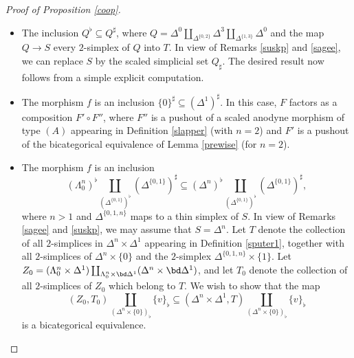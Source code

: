 \begin{proof}[Proof of Proposition \ref{coop}]
\begin{itemize}
\item[$(A_1)$] The inclusion $Q^{\flat} \subseteq Q^{\sharp}$, where
$Q = \Delta^0 \coprod_{ \Delta^{ \{0,2\} }} \Delta^3 \coprod_{ \Delta^{ \{1,3\} }} \Delta^0$
and the map $Q \rightarrow S$ every $2$-simplex
of $Q$ into $T$. In view of Remarks \ref{suskp} and \ref{sagee}, we can replace
$S$ by the scaled simplicial set $Q_{\sharp}$. The desired result now follows from a simple
explicit computation.


\item[$(B_0)$] The morphism $f$ is an inclusion $\{0\}^{\sharp} \subseteq ( \Delta^1)^{\sharp}$.
In this case, $F$ factors as a composition $F' \circ F''$, where $F''$ is a pushout of
a scaled anodyne morphism of type $(A)$ appearing in Definition \ref{slapper} (with $n=2$) and
$F'$ is a pushout of the bicategorical equivalence of Lemma \ref{prewise} (for $n=2$).

\item[$(C_0)$] The morphism $f$ is an inclusion
$$ (\Lambda^n_0)^{\flat} \coprod_{ (\Delta^{ \{0,1\} })^{\flat} } ( \Delta^{ \{0,1\} })^{\sharp}
\subseteq ( \Delta^n )^{\flat} \coprod_{ ( \Delta^{ \{0,1\} })^{\flat} } ( \Delta^{ \{0,1\} })^{\sharp},$$
where $n > 1$ and $\Delta^{ \{0,1,n\} }$ maps to a thin simplex of $S$. In view of
Remarks \ref{sagee} and \ref{suskp}, we may assume that $S = \Delta^n$.
Let $T$ denote the collection of all $2$-simplices in $\Delta^n \times \Delta^1$ appearing
in Definition \ref{sputer1}, together with
all $2$-simplices of $\Delta^n \times \{0\}$ and the $2$-simplex $\Delta^{ \{0,1,n\} } \times \{1\}$.
Let $Z_0 =( \Lambda^n_0 \times \Delta^1) \coprod_{ \Lambda^n_0 \times \bd \Delta^1}
( \Delta^n \times \bd \Delta^1)$, and let $T_0$ denote the collection of all $2$-simplices of
$Z_0$ which belong to $T$. We wish to show that the map 
$$(Z_0, T_0) \coprod_{ ( \Delta^n \times \{0\} )_{\flat} } \{v\}_{\flat}
\subseteq ( \Delta^n \times \Delta^1, T) \coprod_{ (\Delta^n \times \{0\})_{\flat} } \{v\}_{\flat}$$
is a bicategorical equivalence.


\end{itemize}
\end{proof}
